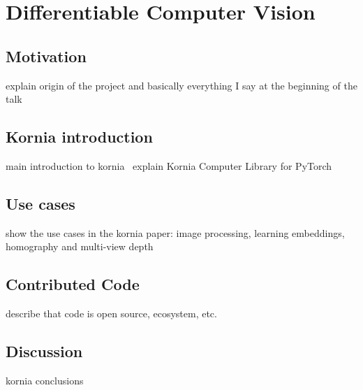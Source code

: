 \chapter{Differentiable Computer Vision}
\label{chap:chap_03}

\section{Motivation}

explain origin of the project and basically everything I say at the beginning of the talk

\section{Kornia introduction} 

main introduction to kornia~\citep{eriba2019kornia, eriba2020kornia}
explain Kornia Computer Library for PyTorch~\citep{paszke2017automatic}

\section{Use cases}

show the use cases in the kornia paper: image processing, learning embeddings, homography and multi-view depth

\section{Contributed Code}

describe that code is open source, ecosystem, etc.

\section{Discussion}

kornia conclusions